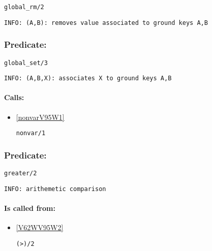 \begin{verbatim}
global_rm/2
\end{verbatim}

{\small \begin{verbatim}
INFO: (A,B): removes value associated to ground keys A,B

\end{verbatim}}

\subsubsection{Predicate:} \label{globalV95WsetV95W3}

\begin{verbatim}
global_set/3
\end{verbatim}

{\small \begin{verbatim}
INFO: (A,B,X): associates X to ground keys A,B

\end{verbatim}}
\paragraph{Calls:} 
\begin{itemize}
\item \ref{nonvarV95W1} 
\begin{verbatim}
nonvar/1
\end{verbatim}

\end{itemize}

\subsubsection{Predicate:} \label{greaterV95W2}

\begin{verbatim}
greater/2
\end{verbatim}

{\small \begin{verbatim}
INFO: arithemetic comparison

\end{verbatim}}
\paragraph{Is called from:} 
\begin{itemize}
\item \ref{V62WV95W2} 
\begin{verbatim}
(>)/2
\end{verbatim}

\end{itemize}

